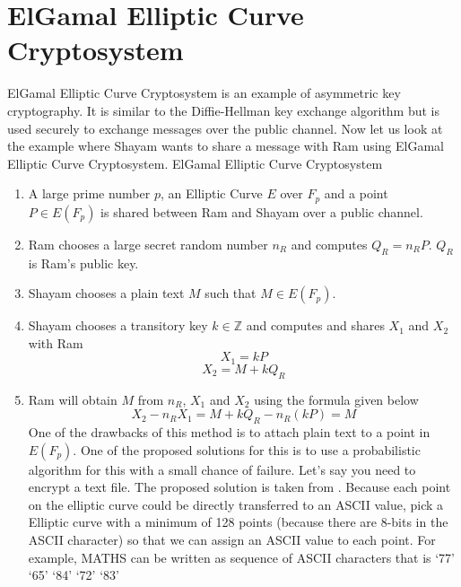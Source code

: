 \documentclass[a4paper,12pt]{report}
\begin{document}
\section{ElGamal Elliptic Curve Cryptosystem}
ElGamal Elliptic Curve Cryptosystem is an example of asymmetric key cryptography. It is similar to the Diffie-Hellman key exchange algorithm but is used securely to exchange messages over the public channel. Now let us look at the example where Shayam wants to share a message with Ram using ElGamal Elliptic Curve Cryptosystem.
\cleardoublepage
ElGamal Elliptic Curve Cryptosystem
\begin{enumerate}
\item A large prime number $p$, an Elliptic Curve $E$ over $F_p$ and a point $P \in E(F_p)$  is shared between Ram and Shayam over a public channel.
 \item Ram chooses a large secret random number $n_R$ and computes $Q_R = n_R P$. $Q_R$ is Ram's public key.  
 \item Shayam chooses a plain text $M$ such that $M \in E(F_p)$.
 \item Shayam chooses a transitory key $k\in \mathbb{Z}$ and computes and shares $X_1$ and $X_2$ with Ram
 $$X_1 = k P$$
 $$X_2 = M+k Q_R$$
 \item Ram will obtain $M$ from $n_R$, $X_1$ and $X_2$ using the formula given below
 $$X_2-n_R X_1=M+k Q_R- n_R (k P)=M$$
 One of the drawbacks of this method is to attach plain text to a point in $ E(F_p)$. One of the proposed solutions for this is to use a probabilistic algorithm for this with a small chance of failure. Let's say you need to encrypt a text file. The proposed solution is taken from \cite{7033751}. Because each point on the elliptic curve could be directly transferred to an ASCII value, pick a Elliptic curve with a minimum of 128 points (because there are 8-bits in the ASCII character) so that we can assign an ASCII value to each point. For example, MATHS can be written as
sequence of ASCII characters that is ‘77’ ‘65’ ‘84’ ‘72’ ‘83’
\end{enumerate}
\cleardoublepage
\end{document}
